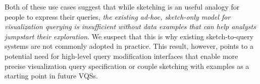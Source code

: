 \par Both of these use cases suggest that while sketching is an useful analogy for people to express their queries, \emph{the existing ad-hoc, sketch-only model for visualization querying is insufficient without data examples that can help analysts jumpstart their exploration}. We suspect that this is why existing sketch-to-query systems are not commonly adopted in practice. This result, however, points to a potential need for high-level query modification interfaces that enable more precise visualization query specification or couple sketching with examples as a starting point in future VQSs. %

